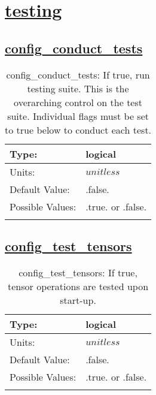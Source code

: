 \section[testing]{\hyperref[sec:nm_tab_testing]{testing}}
\label{sec:nm_sec_testing}
\subsection[config\_conduct\_tests]{\hyperref[sec:nm_tab_testing]{config\_conduct\_tests}}
\label{subsec:nm_sec_config_conduct_tests}
\begin{center}
\begin{longtable}{| p{2.0in} | p{4.0in} |}
    \hline
    Type: & logical \\
    \hline
    Units: & $unitless$ \\
    \hline
    Default Value: & .false. \\
    \hline
    Possible Values: & .true. or .false. \\
    \hline
    \caption{config\_conduct\_tests: If true, run testing suite.  This is the overarching control on the test suite.  Individual flags must be set to true below to conduct each test.}
\end{longtable}
\end{center}
\subsection[config\_test\_tensors]{\hyperref[sec:nm_tab_testing]{config\_test\_tensors}}
\label{subsec:nm_sec_config_test_tensors}
\begin{center}
\begin{longtable}{| p{2.0in} | p{4.0in} |}
    \hline
    Type: & logical \\
    \hline
    Units: & $unitless$ \\
    \hline
    Default Value: & .false. \\
    \hline
    Possible Values: & .true. or .false. \\
    \hline
    \caption{config\_test\_tensors: If true, tensor operations are tested upon start-up.}
\end{longtable}
\end{center}
